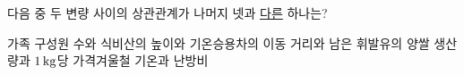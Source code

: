 다음 중 두 변량 사이의 상관관계가 나머지 넷과 \underline{다른} 하나는?
\begin{choicesv}{가족 구성원 수와 식비}{산의 높이와 기온}{승용차의 이동 거리와 남은 휘발유의 양}{쌀 생산량과 $1\mkern3mu \mathrm{kg}$당 가격}{겨울철 기온과 난방비}\end{choicesv}
